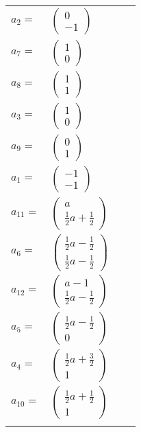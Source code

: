 \documentclass[1p]{elsarticle_modified}
\theoremstyle{definition}
\begin{document}
\begin{tabular}{m{7pt} m{180pt} m{7pt} m{180pt} }
\flushright $a_{2}=$&$\begin{pmatrix}0\\-1\end{pmatrix}$ \\
\flushright $a_{7}=$&$\begin{pmatrix}1\\0\end{pmatrix}$ \\
\flushright $a_{8}=$&$\begin{pmatrix}1\\1\end{pmatrix}$ \\
\flushright $a_{3}=$&$\begin{pmatrix}1\\0\end{pmatrix}$ \\
\flushright $a_{9}=$&$\begin{pmatrix}0\\1\end{pmatrix}$ \\
\flushright $a_{1}=$&$\begin{pmatrix}-1\\-1\end{pmatrix}$ \\
\flushright $a_{11}=$&$\begin{pmatrix}a\\\frac{1}{2} a+\frac{1}{2}\end{pmatrix}$ \\
\flushright $a_{6}=$&$\begin{pmatrix}\frac{1}{2} a-\frac{1}{2}\\\frac{1}{2} a-\frac{1}{2}\end{pmatrix}$ \\
\flushright $a_{12}=$&$\begin{pmatrix}a-1\\\frac{1}{2} a-\frac{1}{2}\end{pmatrix}$ \\
\flushright $a_{5}=$&$\begin{pmatrix}\frac{1}{2} a-\frac{1}{2}\\0\end{pmatrix}$ \\
\flushright $a_{4}=$&$\begin{pmatrix}\frac{1}{2} a+\frac{3}{2}\\1\end{pmatrix}$ \\
\flushright $a_{10}=$&$\begin{pmatrix}\frac{1}{2} a+\frac{1}{2}\\1\end{pmatrix}$\\&\end{tabular}
\end{document}
